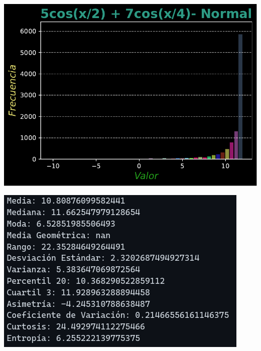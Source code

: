 \documentclass[11pt]{article} %
\begin{document}
	\begin{multicols}{2}
		\begin{minipage}{\linewidth}
			\centering
			\includegraphics[width=1\linewidth]{../transformaciones/per_normal2.pdf}
			\label{fig:perNormHist}
		\end{minipage}
		\vfill\columnbreak
		\begin{minipage}{\linewidth}
			\centering
			\includegraphics[width=1\linewidth]{../transformaciones/per_normal3.png}
			\label{perNormMet}
		\end{minipage}
	\end{multicols}
	
\end{document}
